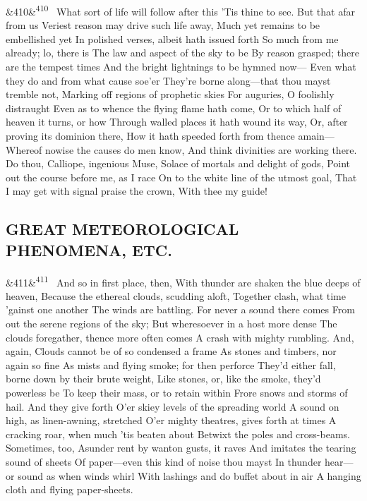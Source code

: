 \documentclass[12pt]{article}
\newcommand{\para}[1][]{\par\noindent\ifx&#1&\else\textsuperscript{\footnotesize #1}~\fi}
\begin{document}
\para[410] What sort of life will follow after this 'Tis thine to see. But that afar from us Veriest reason may drive such life away, Much yet remains to be embellished yet In polished verses, albeit hath issued forth So much from me already; lo, there is The law and aspect of the sky to be By reason grasped; there are the tempest times And the bright lightnings to be hymned now--- Even what they do and from what cause soe'er They're borne along---that thou mayst tremble not, Marking off regions of prophetic skies For auguries, O foolishly distraught Even as to whence the flying flame hath come, Or to which half of heaven it turns, or how Through walled places it hath wound its way, Or, after proving its dominion there, How it hath speeded forth from thence amain--- Whereof nowise the causes do men know, And think divinities are working there. Do thou, Calliope, ingenious Muse, Solace of mortals and delight of gods, Point out the course before me, as I race On to the white line of the utmost goal, That I may get with signal praise the crown, With thee my guide!

\subsection*{GREAT METEOROLOGICAL PHENOMENA, ETC.}

\para[411] And so in first place, then, With thunder are shaken the blue deeps of heaven, Because the ethereal clouds, scudding aloft, Together clash, what time 'gainst one another The winds are battling. For never a sound there comes From out the serene regions of the sky; But wheresoever in a host more dense The clouds foregather, thence more often comes A crash with mighty rumbling. And, again, Clouds cannot be of so condensed a frame As stones and timbers, nor again so fine As mists and flying smoke; for then perforce They'd either fall, borne down by their brute weight, Like stones, or, like the smoke, they'd powerless be To keep their mass, or to retain within Frore snows and storms of hail. And they give forth O'er skiey levels of the spreading world A sound on high, as linen-awning, stretched O'er mighty theatres, gives forth at times A cracking roar, when much 'tis beaten about Betwixt the poles and cross-beams. Sometimes, too, Asunder rent by wanton gusts, it raves And imitates the tearing sound of sheets Of paper---even this kind of noise thou mayst In thunder hear---or sound as when winds whirl With lashings and do buffet about in air A hanging cloth and flying paper-sheets.
\end{document}
